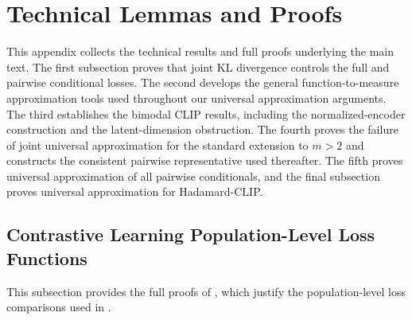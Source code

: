 \documentclass{article}
\begin{document}
\section{Technical Lemmas and Proofs}
This appendix collects the technical results and full proofs underlying
 the main text. The first subsection proves that joint KL divergence controls
 the full and pairwise conditional losses. The second develops the general
 function-to-measure approximation tools used throughout our universal
 approximation arguments. The third establishes the bimodal CLIP results,
 including the normalized-encoder construction and the latent-dimension
 obstruction. The fourth proves the failure of joint universal approximation
 for the standard extension to $m>2$ and constructs the consistent pairwise
 representative used thereafter. The fifth proves universal approximation of
 all pairwise conditionals, and the final subsection proves universal
 approximation for Hadamard-CLIP.

\subsection{Contrastive Learning Population-Level Loss Functions}
This subsection provides the full proofs of
 , which
 justify the population-level loss comparisons used in
 .
\end{document}
